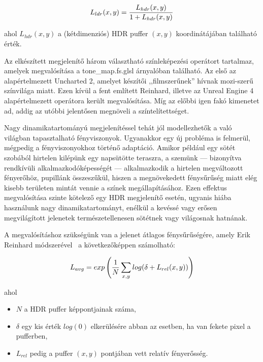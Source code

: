 \[
L_{ldr}(x, y) = { L_{hdr}(x, y) \over 1 + L_{hdr}(x, y) }
\]

ahol \(L_{hdr}(x, y)\) a (kétdimenziós) HDR puffer \((x, y)\) koordinátájában található érték.

Az elkészített megjelenítő három választható színleképezési operátort tartalmaz, amelyek megvalósítása a tone\_map.fs.glsl árnyalóban található. Az első az alapértelmezett Uncharted 2, amelyet készítői ,,filmszerűnek'' hívnak mozi-szerű színvilága miatt. Ezen kívül a fent említett Reinhard, illetve az Unreal Engine 4 alapértelmezett operátora került megvalósítása. Míg az előbbi igen fakó kimenetet ad, addig az utóbbi jelentősen megnöveli a színtelítettséget.

Nagy dinamikatartományú megjelenítéssel tehát jól modellezhetők a való világban tapasztalható fényviszonyok. Ugyanakkor egy új probléma is felmerül, mégpedig a fényviszonyokhoz történő adaptáció. Amikor például egy sötét szobából hirtelen kilépünk egy napsütötte teraszra, a szemünk --- bizonyítva rendkívüli alkalmazkodóképességét --- alkalmazkodik a hirtelen megváltozott fényerőhöz, pupillánk összeszűkül, hiszen a megnövekedett fénysűrűség miatt elég kisebb területen mintát vennie a színek megállapításához. Ezen effektus megvalósítása szinte kötelező egy HDR megjelenítő esetén, ugyanis hiába használunk nagy dinamikatartományt, enélkül a kevéssé vagy erősen megvilágított jelenetek természetellenesen sötétnek vagy világosnak hatnának.

A megvalósításhoz szükségünk van a jelenet átlagos fénysűrűségére, amely Erik Reinhard módszerével~\cite{reinhard2002photographic} a következőképpen számolható:

\[
L_{avg} = exp\left( { 1 \over N } \displaystyle\sum_{x, y} log(\delta + L_{rel}(x, y)) \right)
\]

ahol

\begin{itemize}[noitemsep]
\item \(N\) a HDR puffer képpontjainak száma,
\item \(\delta\) egy kis érték \(log(0)\) elkerülésére abban az esetben, ha van fekete pixel a pufferben,
\item \(L_{rel}\) pedig a puffer \((x, y)\) pontjában vett relatív fényerősség.
\end{itemize}

